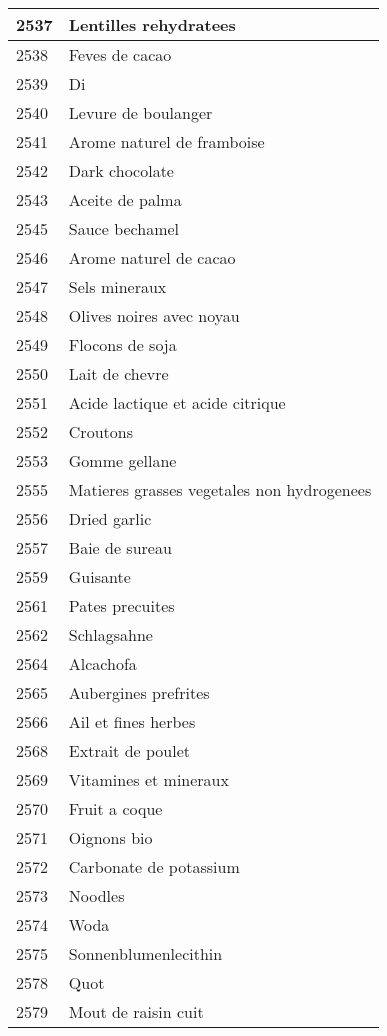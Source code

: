 \begin{longtable}{|l|l|}
2537 & Lentilles rehydratees \\ \hline 
2538 & Feves de cacao \\ \hline 
2539 & Di \\ \hline 
2540 & Levure de boulanger \\ \hline 
2541 & Arome naturel de framboise \\ \hline 
2542 & Dark chocolate \\ \hline 
2543 & Aceite de palma \\ \hline 
2545 & Sauce bechamel \\ \hline 
2546 & Arome naturel de cacao \\ \hline 
2547 & Sels mineraux \\ \hline 
2548 & Olives noires avec noyau \\ \hline 
2549 & Flocons de soja \\ \hline 
2550 & Lait de chevre \\ \hline 
2551 & Acide lactique et acide citrique \\ \hline 
2552 & Croutons \\ \hline 
2553 & Gomme gellane \\ \hline 
2555 & Matieres grasses vegetales non hydrogenees \\ \hline 
2556 & Dried garlic \\ \hline 
2557 & Baie de sureau \\ \hline 
2559 & Guisante \\ \hline 
2561 & Pates precuites \\ \hline 
2562 & Schlagsahne \\ \hline 
2564 & Alcachofa \\ \hline 
2565 & Aubergines prefrites \\ \hline 
2566 & Ail et fines herbes \\ \hline 
2568 & Extrait de poulet \\ \hline 
2569 & Vitamines et mineraux \\ \hline 
2570 & Fruit a coque \\ \hline 
2571 & Oignons bio \\ \hline 
2572 & Carbonate de potassium \\ \hline 
2573 & Noodles \\ \hline 
2574 & Woda \\ \hline 
2575 & Sonnenblumenlecithin \\ \hline 
2578 & Quot \\ \hline 
2579 & Mout de raisin cuit \\ \hline 

\end{longtable}
